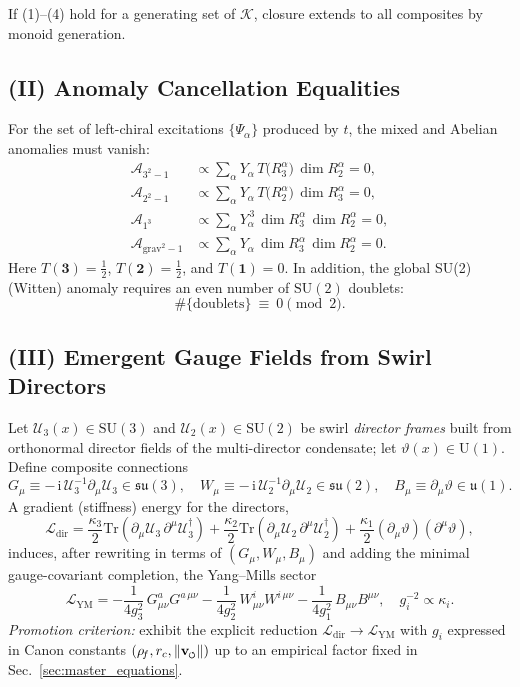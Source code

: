 \documentclass[11pt]{article}
\newcommand{\Tr}{\mathrm{Tr}}
\newcommand{\ii}{\mathrm{i}}
\begin{document}
\begin{proposition}
	If (1)–(4) hold for a generating set of $\mathcal{K}$, closure extends to all composites by monoid generation.
\end{proposition}

\subsection*{(II) Anomaly Cancellation Equalities}
For the set of left-chiral excitations $\{\Psi_\alpha\}$ produced by $t$, the mixed and Abelian anomalies must vanish:
\begin{align}
	\mathcal A_{3^2-1} &\propto \sum_\alpha Y_\alpha\,T\!\big(R_3^\alpha\big)\,\dim R_2^\alpha = 0,\label{eq:A321}\\
	\mathcal A_{2^2-1} &\propto \sum_\alpha Y_\alpha\,T\!\big(R_2^\alpha\big)\,\dim R_3^\alpha = 0,\label{eq:A221}\\
	\mathcal A_{1^3} &\propto \sum_\alpha Y_\alpha^{\,3}\,\dim R_3^\alpha\,\dim R_2^\alpha = 0,\label{eq:A111}\\
	\mathcal A_{\mathrm{grav}^2-1} &\propto \sum_\alpha Y_\alpha\,\dim R_3^\alpha\,\dim R_2^\alpha = 0.\label{eq:Agrav}
\end{align}
Here $T(\mathbf 3)=\tfrac12$, $T(\mathbf 2)=\tfrac12$, and $T(\mathbf 1)=0$. In addition, the global SU(2) (Witten) anomaly requires an even number of $\mathrm{SU}(2)$ doublets:
\[
	\#\{\text{doublets}\}\ \equiv\ 0 \pmod 2.
\]

\subsection*{(III) Emergent Gauge Fields from Swirl Directors}
Let $\mathcal U_3(x)\in \mathrm{SU}(3)$ and $\mathcal U_2(x)\in \mathrm{SU}(2)$ be swirl \emph{director frames} built from orthonormal director fields of the multi-director condensate; let $\vartheta(x)\in \mathrm{U}(1)$. Define composite connections
\[
	G_\mu \equiv -\,\ii\,\mathcal U_3^{-1}\partial_\mu \mathcal U_3\in\mathfrak{su}(3),\quad
	W_\mu \equiv -\,\ii\,\mathcal U_2^{-1}\partial_\mu \mathcal U_2\in\mathfrak{su}(2),\quad
	B_\mu \equiv \partial_\mu \vartheta \in \mathfrak u(1).
\]
A gradient (stiffness) energy for the directors,
\[
	\mathcal L_{\text{dir}}=\frac{\kappa_3}{2}\Tr(\partial_\mu\mathcal U_3\,\partial^\mu\mathcal U_3^\dagger)
	+\frac{\kappa_2}{2}\Tr(\partial_\mu\mathcal U_2\,\partial^\mu\mathcal U_2^\dagger)
	+\frac{\kappa_1}{2}(\partial_\mu\vartheta)(\partial^\mu\vartheta),
\]
induces, after rewriting in terms of $(G_\mu,W_\mu,B_\mu)$ and adding the minimal gauge-covariant completion, the Yang–Mills sector
\[
	\mathcal L_{\text{YM}}=-\frac{1}{4 g_3^2}\,G_{\mu\nu}^a G^{a\,\mu\nu}
	-\frac{1}{4 g_2^2}\,W_{\mu\nu}^i W^{i\,\mu\nu}
	-\frac{1}{4 g_1^2}\,B_{\mu\nu}B^{\mu\nu},
	\quad
	g_i^{-2}\propto \kappa_i.
\]
\emph{Promotion criterion:} exhibit the explicit reduction $\mathcal L_{\text{dir}}\to\mathcal L_{\text{YM}}$ with $g_i$ expressed in Canon constants $(\rho_{\!f},r_c,\|\vswirl\|)$ up to an empirical factor fixed in Sec.~\ref{sec:master_equations}.
\end{document}
